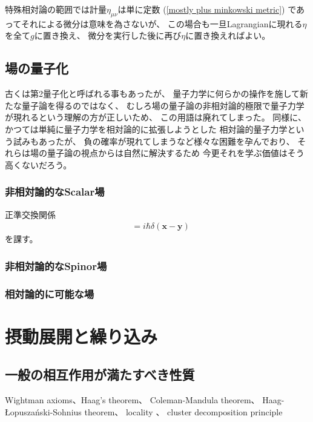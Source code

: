 特殊相対論の範囲では計量$\eta_{\mu \nu}$は単に定数
(\ref{mostly plus minkowski metric})
であってそれによる微分は意味を為さないが、
この場合も一旦Lagrangianに現れる$\eta$を全て$g$に置き換え、
微分を実行した後に再び$\eta$に置き換えればよい。

\subsection{場の量子化}

古くは第2量子化と呼ばれる事もあったが、
量子力学に何らかの操作を施して新たな量子論を得るのではなく、
むしろ場の量子論の非相対論的極限で量子力学が現れるという理解の方が正しいため、
この用語は廃れてしまった。
同様に、かつては単純に量子力学を相対論的に拡張しようとした
相対論的量子力学という試みもあったが、
負の確率が現れてしまうなど様々な困難を孕んでおり、
それらは場の量子論の視点からは自然に解決するため
今更それを学ぶ価値はそう高くないだろう。

\subsubsection{非相対論的なScalar場}

正準交換関係
\begin{align}
    [\hat{\phi}(\bm{x}), \hat{\pi}(\bm{y})]
    &=
    i \hbar \delta(\bm{x} - \bm{y})
\end{align}
を課す。

\subsubsection{非相対論的なSpinor場}

\subsubsection{相対論的に可能な場}
\label{representation of Lorentz group}

\section{摂動展開と繰り込み}

\subsection{一般の相互作用が満たすべき性質}
Wightman axioms、Haag's theorem、
Coleman-Mandula theorem、
Haag-\L{}opusza\'nski-Sohnius theorem、
locality
\label{locality}
、
cluster decomposition principle